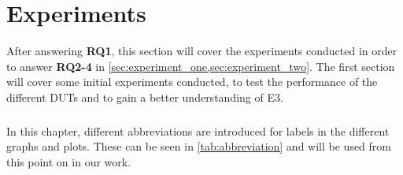 \chapter{Experiments}\label{ch:experiments}

After answering \textbf{RQ1}, this section will cover the experiments conducted in order to answer  \textbf{RQ2-4} in \cref{sec:experiment_one,sec:experiment_two}. The first section will cover some initial experiments conducted, to test the performance of the different DUTs and to gain a better understanding of E3.


\paragraph*{}
In this chapter, different abbreviations are introduced for labels in the different graphs and plots. These can be seen in \cref{tab:abbreviation} and will be used from this point on in our work.






